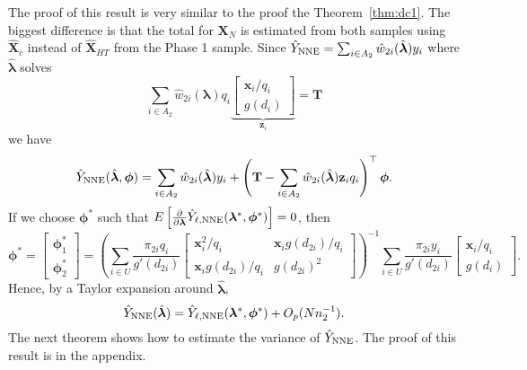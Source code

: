 \documentclass[12pt]{article}
\renewcommand{\bf}[1]{\mathbf{#1}}
\begin{document}
The proof of this result is very similar to the proof the
Theorem~\ref{thm:dc1}. The biggest difference is that the total for $\bf X_N$ is
estimated from both samples using $\hat{\bf X}_c$ instead of 
$\hat{\bf X}_{HT}$ from the Phase 1 sample. 
Since $\hat Y_{\rm NNE} = \sum_{i \in A_2} \hat w_{2i}(\hat{\bm \lambda})y_i$
where $\hat{\bm \lambda}$ solves
\begin{equation}
  \sum_{i \in A_2} \hat w_{2i}(\bm \lambda) q_i
  \underbrace{
  \begin{bmatrix} 
    \bf x_i / q_i \\ g(d_i)
\end{bmatrix}}_{\bf z_i} = \bf T
\end{equation}
we have 
$$\hat Y_{\rm NNE} (\hat{\bm \lambda}, \bm \phi) = \sum_{i \in A_2} \hat
w_{2i}(\hat{\bm \lambda})y_i + \left(\bf T - \sum_{i \in A_2} \hat
w_{2i}(\hat{\bm \lambda}) \bf z_i q_i\right)^\top \bm \phi.$$
If we choose $\bm \phi^*$ such that $E\left[\frac{\partial}{\partial \bm \lambda} 
  \hat Y_{\ell, \rm NNE}(\bm \lambda^*, \bm \phi^*)\right] = 0$, then
$$\bm \phi^* =
\begin{bmatrix}
  \bm \phi^*_1 \\ \bm \phi^*_2
\end{bmatrix} = 
\left(\sum_{i \in U} \frac{\pi_{2i} q_i}{g'(d_{2i})} 
\begin{bmatrix}
  \bf x_i^2 / q_i & \bf x_i g(d_{2i}) / q_i \\
  \bf x_i g(d_{2i}) / q_i & g(d_{2i})^2
\end{bmatrix}
\right)^{-1}
\sum_{i \in U} \frac{\pi_{2i} y_i}{g'(d_{2i})} 
\begin{bmatrix} \bf x_i / q_i \\ g(d_i) \end{bmatrix}.
$$
Hence, by a Taylor expansion around $\hat{\bm \lambda}$,
$$\hat Y_{\rm NNE}(\hat{\bm \lambda}) = \hat Y_{\ell, \rm NNE}(\bm \lambda^*, 
\bm \phi^*) + O_p(Nn_2^{-1}).$$
The next theorem shows how to estimate the variance of $\hat Y_{\rm NNE}$.
The proof of this result is in the appendix.
\end{document}
